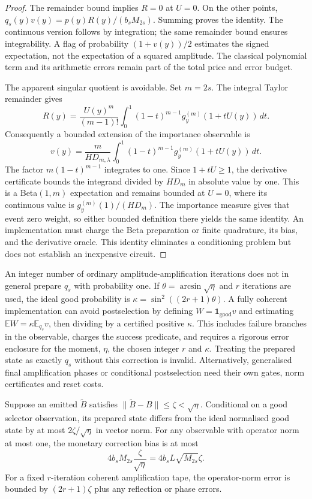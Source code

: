 \begin{proof}
The remainder bound implies $R=0$ at $U=0$. On the other points,
$q_s(y)v(y)=p(y)R(y)/(b_sM_{2s})$. Summing proves the identity.
The continuous version follows by integration; the same remainder bound
ensures integrability. A flag of probability $(1+v(y))/2$ estimates the
signed expectation, not the expectation of a squared amplitude.
The classical polynomial term and its arithmetic errors remain part
of the total price and error budget.

The apparent singular quotient is avoidable. Set $m=2s$. The integral
Taylor remainder gives
\[
 R(y)=\frac{U(y)^m}{(m-1)!}\int_0^1(1-t)^{m-1}
                  g_y^{(m)}(1+tU(y))\,dt.
\]
Consequently a bounded extension of the importance observable is
\[
 v(y)=\frac{m}{H D_{m,\lambda}}\int_0^1(1-t)^{m-1}
                  g_y^{(m)}(1+tU(y))\,dt.
\]
The factor $m(1-t)^{m-1}$ integrates to one. Since $1+tU\geq1$,
the derivative certificate bounds the integrand divided by $H D_m$
in absolute value by one. This is a Beta$(1,m)$ expectation and remains
bounded at $U=0$, where its continuous value is
$g_y^{(m)}(1)/(H D_m)$. The importance measure gives that event zero
weight, so either bounded definition there yields the same identity.
An implementation must charge the Beta preparation or finite quadrature,
its bias, and the derivative oracle. This identity eliminates a
conditioning problem but does not establish an inexpensive circuit.
\end{proof}

An integer number of ordinary amplitude-amplification iterations does
not in general prepare $q_s$ with probability one. If
$\theta=\arcsin\sqrt\eta$ and $r$ iterations are used, the ideal good
probability is $\kappa=\sin^2((2r+1)\theta)$. A fully coherent
implementation can avoid postselection by defining
$W=\mathbf1_{\mathrm{good}}v$ and estimating
$\mathbb E W=\kappa\mathbb E_{q_s}v$, then dividing by a certified
positive $\kappa$. This includes failure branches in the observable,
charges the success predicate, and requires a rigorous error enclosure
for the moment, $\eta$, the chosen integer $r$ and $\kappa$. Treating
the prepared state as exactly $q_s$ without this correction is invalid.
Alternatively, generalised final amplification phases or conditional
postselection need their own gates, norm certificates and reset costs.

\begin{proposition}
Suppose an emitted $\widetilde B$ satisfies
$\|\widetilde B-B\|\leq\zeta<\sqrt\eta$. Conditional on a good
selector observation, its prepared state differs from the ideal
normalised good state by at most $2\zeta/\sqrt\eta$ in vector norm.
For any observable with operator norm at most one, the monetary
correction bias is at most
\[
 4b_sM_{2s}\frac\zeta{\sqrt\eta}
   =4b_sL\sqrt{M_{2s}}\zeta.
\]
For a fixed $r$-iteration coherent amplification tape, the operator-norm
error is bounded by $(2r+1)\zeta$ plus any reflection or phase errors.
\end{proposition}

